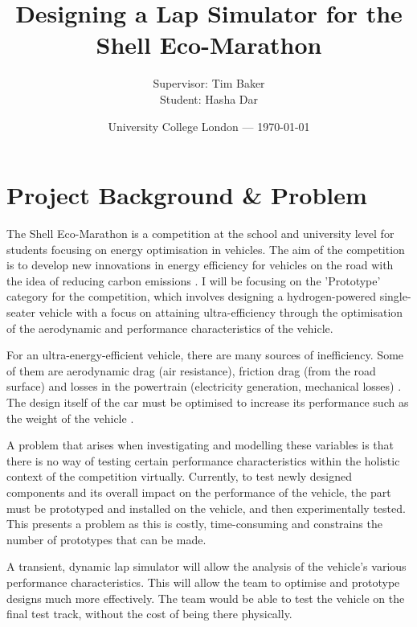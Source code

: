 \documentclass{article}
\title{Designing a Lap Simulator for the Shell Eco-Marathon} %
\author{Supervisor: Tim Baker\\Student: Hasha Dar} %
\date{University College London --- \today} %
\begin{document}
\maketitle %

\section{Project Background \& Problem}
The Shell Eco-Marathon is a competition at the school and university level for students focusing on energy optimisation in vehicles. The aim of the competition is to develop new innovations in energy efficiency for vehicles on the road with the idea of reducing carbon emissions \citep{ShellEco2021}. I will be focusing on the 'Prototype' category for the competition, which involves designing a hydrogen-powered single-seater vehicle with a focus on attaining ultra-efficiency through the optimisation of the aerodynamic and performance characteristics of the vehicle.

For an ultra-energy-efficient vehicle, there are many sources of inefficiency. Some of them are aerodynamic drag (air resistance), friction drag (from the road surface) and losses in the powertrain (electricity generation, mechanical losses) \citep{Wei2019}. The design itself of the car must be optimised to increase its performance such as the weight of the vehicle \citep{Tsirogiannis2019}.

A problem that arises when investigating and modelling these variables is that there is no way of testing certain performance characteristics within the holistic context of the competition virtually. Currently, to test newly designed components and its overall impact on the performance of the vehicle, the part must be prototyped and installed on the vehicle, and then experimentally tested. This presents a problem as this is costly, time-consuming and constrains the number of prototypes that can be made.

A transient, dynamic lap simulator will allow the analysis of the vehicle's various performance characteristics. This will allow the team to optimise and prototype designs much more effectively. The team would be able to test the vehicle on the final test track, without the cost of being there physically.
\end{document}
